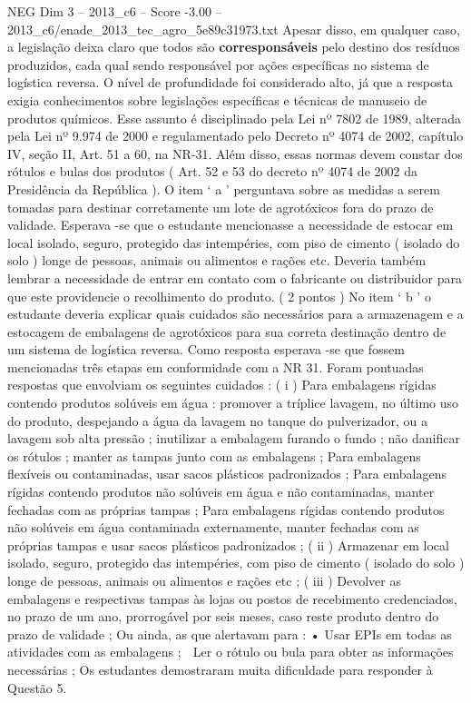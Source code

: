 \begin{textsample}{NEG Dim 3 – 2013\_c6 – Score -3.00 – 2013\_c6/enade\_2013\_tec\_agro\_5e89c31973.txt}
Apesar disso, em qualquer caso, a legislação deixa claro que todos são \textbf{corresponsáveis} pelo destino dos resíduos produzidos, cada qual sendo responsável por ações específicas no sistema de logística reversa.
O nível de profundidade foi considerado alto, já que a resposta exigia conhecimentos sobre legislações específicas e técnicas de manuseio de produtos químicos.
Esse assunto é disciplinado pela Lei nº 7802 de 1989, alterada pela Lei nº 9.974 de 2000 e regulamentado pelo Decreto nº 4074 de 2002, capítulo IV, seção II, Art. 51 a 60, na NR-31.
Além disso, essas normas devem constar dos rótulos e bulas dos produtos ( Art. 52 e 53 do decreto nº 4074 de 2002 da Presidência da República ).
O item ‘ a ’ perguntava sobre as medidas a serem tomadas para destinar corretamente um lote de agrotóxicos fora do prazo de validade.
Esperava -se que o estudante mencionasse a necessidade de estocar em local isolado, seguro, protegido das intempéries, com piso de cimento ( isolado do solo ) longe de pessoas, animais ou alimentos e rações etc.
Deveria também lembrar a necessidade de entrar em contato com o fabricante ou distribuidor para que este providencie o recolhimento do produto. ( 2 pontos ) No item ‘ b ’ o estudante deveria explicar quais cuidados são necessários para a armazenagem e a estocagem de embalagens de agrotóxicos para sua correta destinação dentro de um sistema de logística reversa.
Como resposta esperava -se que fossem mencionadas três etapas em conformidade com a NR 31.
Foram pontuadas respostas que envolviam os seguintes cuidados : ( i ) Para embalagens rígidas contendo produtos solúveis em água : promover a tríplice lavagem, no último uso do produto, despejando a água da lavagem no tanque do pulverizador, ou a lavagem sob alta pressão ; inutilizar a embalagem furando o fundo ; não danificar os rótulos ; manter as tampas junto com as embalagens ; Para embalagens flexíveis ou contaminadas, usar sacos plásticos padronizados ; Para embalagens rígidas contendo produtos não solúveis em água e não contaminadas, manter fechadas com as próprias tampas ; Para embalagens rígidas contendo produtos não solúveis em água contaminada externamente, manter fechadas com as próprias tampas e usar sacos plásticos padronizados ; ( ii ) Armazenar em local isolado, seguro, protegido das intempéries, com piso de cimento ( isolado do solo ) longe de pessoas, animais ou alimentos e rações etc ; ( iii ) Devolver as embalagens e respectivas tampas às lojas ou postos de recebimento credenciados, no prazo de um ano, prorrogável por seis meses, caso reste produto dentro do prazo de validade ; Ou ainda, as que alertavam para : • Usar EPIs em todas as atividades com as embalagens ;  Ler o rótulo ou bula para obter as informações necessárias ; Os estudantes demostraram muita dificuldade para responder à Questão 5.

\end{textsample}
